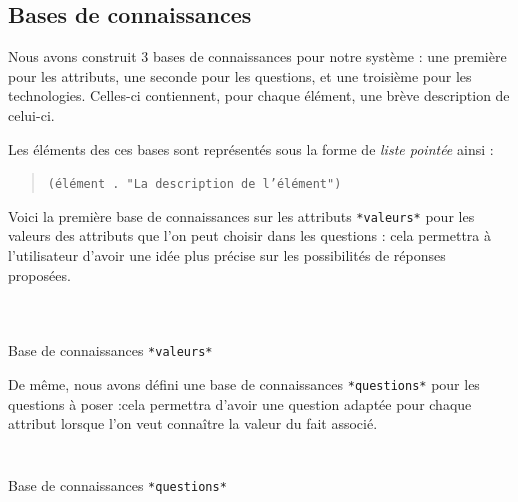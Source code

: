 \documentclass[a4paper,12pt]{article}
\begin{document}
\newpage
\subsection{Bases de connaissances}

Nous avons construit 3 bases de connaissances pour notre système : une première pour les attributs, une seconde pour les questions, et une troisième pour les technologies. Celles-ci contiennent, pour chaque élément, une brève description de celui-ci.

Les éléments des ces bases sont représentés sous la forme de \textit{liste pointée} ainsi :

\begin{quotation}
	\texttt{(élément . "La description de l'élément")}
\end{quotation}
 
 Voici la première base de connaissances sur les attributs \texttt{*valeurs*} pour les valeurs des attributs que l'on peut choisir dans les questions : cela permettra à l'utilisateur d'avoir une idée plus précise sur les possibilités de réponses proposées.

\begin{listing}[H]
	\centering
	\inputminted[breaklines=true,linenos,lastline=32]{lisp}{../valeurs.lisp}
\end{listing}

\begin{listing}[H]
	\centering
	\inputminted[breaklines=true,linenos,firstline=33,lastline=69]{lisp}{../valeurs.lisp}
\end{listing}

\begin{listing}[H]
	\centering
	\inputminted[breaklines=true,linenos,firstline=70]{lisp}{../valeurs.lisp}
	\caption{Base de connaissances \texttt{*valeurs*}}
\end{listing}
 

De même, nous avons défini une base de connaissances \texttt{*questions*} pour les questions à poser :cela permettra d'avoir une question adaptée pour chaque attribut lorsque l'on veut connaître la valeur du fait associé.

\begin{listing}[H]
	\centering
	\inputminted[breaklines=true,linenos,lastline=23]{lisp}{../questions.lisp}
\end{listing}


\begin{listing}[H]
	\centering
	\inputminted[breaklines=true,linenos,firstline=24]{lisp}{../questions.lisp}
	\caption{Base de connaissances \texttt{*questions*}}
\end{listing}
\end{document}
